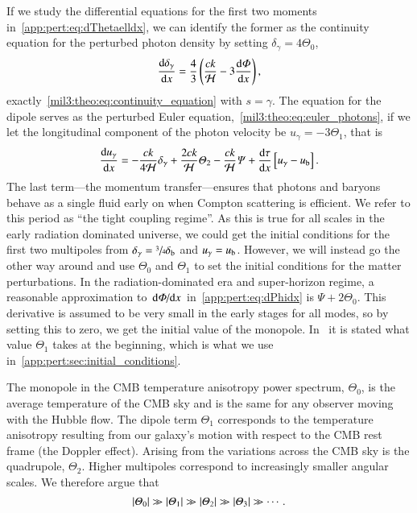     If we study the differential equations for the first two moments in~\cref{app:pert:eq:dThetaelldx}, we can identify the former as the continuity equation for the perturbed photon density by setting $\delta_\gamma = 4\Theta_0$,
    \begin{equation}
        \dv{\delta_\gamma}{x}=\frac{4}{3} \left(\frac{ck}{\mathcal{H}} - 3\dv{\ensuremath{\varPhi}}{x}\right),
    \end{equation}
    exactly~\cref{mil3:theo:eq:continuity_equation} with $s=\gamma$. The equation for the dipole serves as the perturbed Euler equation,~\cref{mil3:theo:eq:euler_photons}, if we let the longitudinal component of the photon velocity be $u_\gamma=-3\Theta_1$, that is
    \begin{equation}\label{mil3:theo:eq:euler_photons}
        \dv{u_\gamma}{x} = - \frac{ck}{4\mathcal{H}} \delta_\gamma + \frac{2ck}{\mathcal{H}}\varTheta_2 - \frac{ck}{\mathcal{H}}\varPsi + \dv{\tau}{x}\left[u_\gamma -u_\mathrm{b}\right].
    \end{equation}
    The last term---the momentum transfer---ensures that photons and baryons behave as a single fluid early on when Compton scattering is efficient. We refer to this period as ``the tight coupling regime''. As this is true for all scales in the early radiation dominated universe, we could get the initial conditions for the first two multipoles from $\delta_\gamma=\sfrac{3}{4}\delta_\mathrm{b}$ and $u_\gamma=u_\mathrm{b}$. However, we will instead go the other way around and use $\Theta_0$ and $\Theta_1$ to set the initial conditions for the matter perturbations. In the radiation-dominated era and super-horizon regime, a reasonable approximation to $\dv*{\varPhi}{x}$ in~\cref{app:pert:eq:dPhidx} is $\Psi + 2\Theta_0$. This derivative is assumed to be very small in the early stages for all modes, so by setting this to zero, we get the initial value of the monopole. In~\citet[Eq.~(7.95)]{DodelsonBook} it is stated what value $\Theta_1$ takes at the beginning, which is what we use in~\cref{app:pert:sec:initial_conditions}.

    The monopole in the CMB temperature anisotropy power spectrum, $\Theta_0$, is the average temperature of the CMB sky and is the same for any observer moving with the Hubble flow. The dipole term $\Theta_1$ corresponds to the temperature anisotropy resulting from our galaxy's motion with respect to the CMB rest frame (the Doppler effect). Arising from the variations across the CMB sky is the quadrupole, $\Theta_2$. Higher multipoles correspond to increasingly smaller angular scales. We therefore argue that 
    \begin{equation}
        \abs{\Theta_0} \gg \abs{\Theta_1} \gg \abs{\Theta_2} \gg \abs{\Theta_3} \gg \cdots. %
    \end{equation}
    

